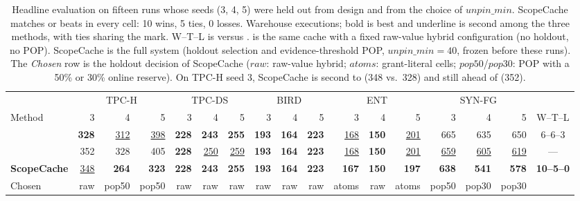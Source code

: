 \begin{table}[t]
\centering
\caption{Headline evaluation on fifteen runs whose seeds (3, 4, 5) were held out from design and from the choice of $\mathit{unpin\_min}$. ScopeCache matches or beats  in every cell: 10 wins, 5 ties, 0 losses. Warehouse executions; bold is best and underline is second among the three methods, with ties sharing the mark. W--T--L is versus .  is the same cache with a fixed raw-value hybrid configuration (no holdout, no POP). ScopeCache is the full system (holdout selection and evidence-threshold POP, $\mathit{unpin\_min}=40$, frozen before these runs). The \emph{Chosen} row is the holdout decision of ScopeCache ($\mathit{raw}$: raw-value hybrid; $\mathit{atoms}$: grant-literal cells; $\mathit{pop50}$/$\mathit{pop30}$: POP with a 50\% or 30\% online reserve). On TPC-H seed 3, ScopeCache is second to  (348 vs.\ 328) and still ahead of  (352).}
\label{tab:main}
\footnotesize
\setlength{\tabcolsep}{2.5pt}
\begin{tabular}{@{}lrrrrrrrrrrrrrrrc@{}}
\toprule
 & \multicolumn{3}{c}{TPC-H} & \multicolumn{3}{c}{TPC-DS} & \multicolumn{3}{c}{BIRD} & \multicolumn{3}{c}{ENT} & \multicolumn{3}{c}{SYN-FG} & \\
\cmidrule(lr){2-4}\cmidrule(lr){5-7}\cmidrule(lr){8-10}\cmidrule(lr){11-13}\cmidrule(lr){14-16}
Method & 3 & 4 & 5 & 3 & 4 & 5 & 3 & 4 & 5 & 3 & 4 & 5 & 3 & 4 & 5 & W--T--L\\
\midrule
\M{SC-hybrid} & \textbf{328} & \underline{312} & \underline{398} & \textbf{228} & \textbf{243} & \textbf{255} & \textbf{193} & \textbf{164} & \textbf{223} & \underline{168} & \textbf{150} & \underline{201} & 665 & 635 & 650 & 6--6--3\\
\M{PerScope+V} & 352 & 328 & 405 & \textbf{228} & \underline{250} & \underline{259} & \textbf{193} & \textbf{164} & \textbf{223} & \underline{168} & \textbf{150} & \underline{201} & \underline{659} & \underline{605} & \underline{619} & ---\\
\textbf{ScopeCache} & \underline{348} & \textbf{264} & \textbf{323} & \textbf{228} & \textbf{243} & \textbf{255} & \textbf{193} & \textbf{164} & \textbf{223} & \textbf{167} & \textbf{150} & \textbf{197} & \textbf{638} & \textbf{541} & \textbf{578} & \textbf{10--5--0}\\
\midrule
Chosen & raw & pop50 & pop50 & raw & raw & raw & raw & raw & raw & atoms & raw & atoms & pop50 & pop30 & pop30 & \\
\bottomrule
\end{tabular}
\end{table}

